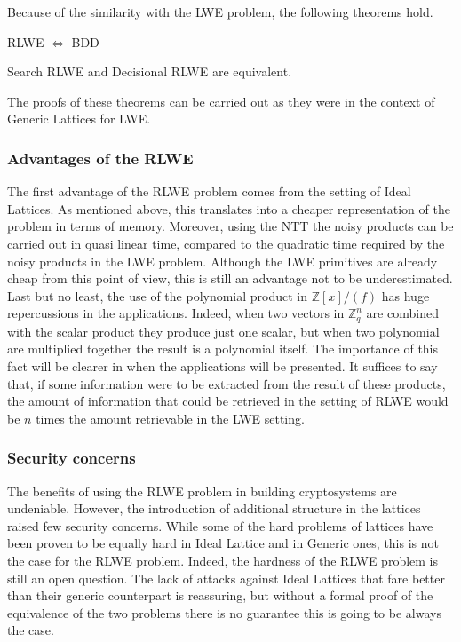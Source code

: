 Because of the similarity with the LWE problem, the following theorems hold.

\begin{theorem}
RLWE $\Leftrightarrow$ BDD
\end{theorem}
\begin{theorem}
Search RLWE and Decisional RLWE are equivalent.
\end{theorem}

The proofs of these theorems can be carried out as they were in the context of Generic Lattices for LWE.\\

\subsubsection{Advantages of the RLWE}
The first advantage of the RLWE problem comes from the setting of Ideal Lattices. As mentioned above, this translates into a cheaper representation of the problem in terms of memory. Moreover, using the NTT the noisy products can be carried out in quasi linear time, compared to the quadratic time required by the noisy products in the LWE problem. Although the LWE primitives are already cheap from this point of view, this is still an advantage not to be underestimated.\\
Last but no least, the use of the polynomial product in $\mathbb{Z}[x]/(f)$ has huge repercussions in the applications. Indeed, when two vectors in $\mathbb{Z}_q^n$ are combined with the scalar product they produce just one scalar, but when two polynomial are multiplied together the result is a polynomial itself. The importance of this fact will be clearer in when the applications will be presented. It suffices to say that, if some information were to be extracted from the result of these products, the amount of information that could be retrieved in the setting of RLWE would be $n$ times the amount retrievable in the LWE setting.

\subsubsection{Security concerns}
The benefits of using the RLWE problem in building cryptosystems are undeniable. However, the introduction of additional structure in the lattices raised few security concerns. While some of the hard problems of lattices have been proven to be equally hard in Ideal Lattice and in Generic ones, this is not the case for the RLWE problem. Indeed, the hardness of the RLWE problem is still an open question. The lack of attacks against Ideal Lattices that fare better than their generic counterpart is reassuring, but without a formal proof of the equivalence of the two problems there is no guarantee this is going to be always the case.
